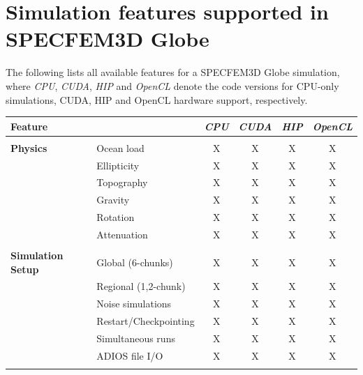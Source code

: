 \chapter*{Simulation features supported in SPECFEM3D Globe}

The following lists all available features for a SPECFEM3D Globe simulation,
where {\it CPU}, {\it CUDA}, {\it HIP} and {\it OpenCL} denote the code versions for CPU-only simulations,
CUDA, HIP and OpenCL hardware support, respectively.
%
\begin{table}[htp]
\label{table:features}
\begin{center}
\begin{tabular}{ l l c c c c}
\hline
{\bf Feature}   &   & {\it CPU} & {\it CUDA} & {\it HIP}  & {\it OpenCL} \\
\hline
& & & & & \\
{\bf Physics}   & Ocean load      & X  & X  & X  & X \\
                & Ellipticity     & X  & X  & X  & X \\
                & Topography      & X  & X  & X  & X \\
                & Gravity         & X  & X  & X  & X \\
                & Rotation        & X  & X  & X  & X \\
                & Attenuation     & X  & X  & X  & X \\
\hline
& & & & & \\
{\bf Simulation Setup}  & Global (6-chunks)       & X  & X  & X  & X \\
                        & Regional (1,2-chunk)    & X  & X  & X  & X \\
                        & Noise simulations       & X  & X  & X  & X \\
                        & Restart/Checkpointing   & X  & X  & X  & X \\
                        & Simultaneous runs       & X  & X  & X  & X \\
                        & ADIOS file I/O          & X  & X  & X  & X \\
\hline
& & & & & \\

\end{tabular}
\end{center}
\end{table}
